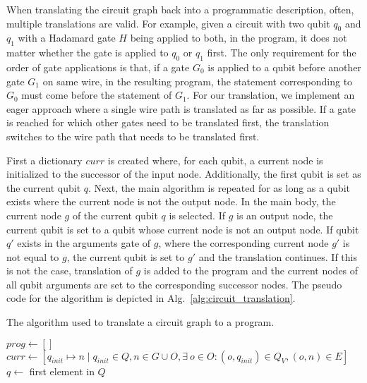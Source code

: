 When translating the circuit graph back into a programmatic description, often, multiple translations are valid. For example, given a circuit with two qubit $q_0$ and $q_1$ with a Hadamard gate $H$ being applied to both, in the program, it does not matter whether the gate is applied to $q_0$ or $q_1$ first. The only requirement for the order of gate applications is that, if a gate $G_0$ is applied to a qubit before another gate $G_1$ on same wire, in the resulting program, the statement corresponding to $G_0$ must come before the statement of $G_1$. For our translation, we implement an eager approach where a single wire path is translated as far as possible. If a gate is reached for which other gates need to be translated first, the translation switches to the wire path that needs to be translated first. 

First a dictionary $curr$ is created where, for each qubit, a current node is initialized to the successor of the input node. Additionally, the first qubit is set as the current qubit $q$. Next, the main algorithm is repeated for as long as a qubit exists where the current node is not the output node. In the main body, the current node $g$ of the current qubit $q$ is selected. If $g$ is an output node, the current qubit is set to a qubit whose current node is not an output node. If qubit $q'$ exists in the arguments gate of $g$, where the corresponding current node $g'$ is not equal to $g$, the current qubit is set to $g'$ and the translation continues. If this is not the case, translation of $g$ is added to the program and the current nodes of all qubit arguments are set to the corresponding successor nodes. The pseudo code for the algorithm is depicted in Alg.~\ref{alg:circuit_translation}.

\begin{algorithm}
    \caption{The algorithm used to translate a circuit graph to a program.}\label{alg:circuit_translation}
    \label{alg:concept_optimizationAlgorithm}
    $prog \gets []$\;
    $curr \gets [q_{init} \mapsto n \mid q_{init} \in Q, n \in G \cup O, \exists \ o \in O : (o, q_{init}) \in Q_V, (o, n) \in E]$\;
    $q \gets$ first element in $Q$\; 
\end{algorithm}

